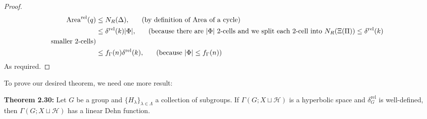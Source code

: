 \documentclass[12pt]{article}
\newcommand{\vs}{\vskip10pt}
\begin{document}
\begin{proof}
		\vs 
		
		\begin{align*}
		\text{Area}^{\text{rel}}(q) &\leq N_R (\Delta) \hspace{0.5cm, } \text{ (by definition of Area of a cycle)} \\
		&\leq \delta^{\text{rel}}(k) \vert \Phi \vert \hspace{0.5cm, } \text{ (because there are } \vert \Phi \vert \text{ 2-cells and we split each 2-cell into }  N_{R} (\Xi(\Pi)) \leq \delta^{\text{rel}}(k) \\ 
		\text{ smaller 2-cells)} \\
		& \leq f_{\Gamma} (n) \delta^{\text{rel}}(k) \hspace{0.5cm, } \text{ (because  } \vert \Phi \vert \leq f_{\Gamma}(n) )
		\end{align*}
		As required. 
	\end{proof}

	To prove our desired theorem, we need one more result:
	
	\vs 
	
	\textbf{Theorem 2.30: } Let $G$ be a group and $\{H_{\lambda}\}_{\lambda \in \Lambda}$ a collection of subgroups. If $\Gamma(G; X \sqcup \mathcal{H})$ is a hyperbolic space and $\delta^{\text{rel}}_G$ is well-defined, then $\Gamma(G; X \sqcup \mathcal{H})$ has a linear Dehn function. 
	
\end{document}
